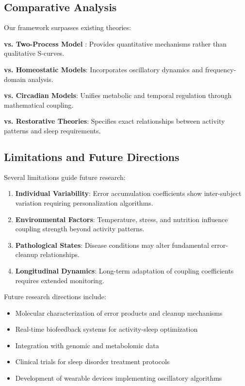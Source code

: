 \documentclass[12pt]{article}
\begin{document}
\subsection{Comparative Analysis}

Our framework surpasses existing theories:

\textbf{vs. Two-Process Model} \citep{borbely1982two}: Provides quantitative mechanisms rather than qualitative S-curves.

\textbf{vs. Homeostatic Models}: Incorporates oscillatory dynamics and frequency-domain analysis.

\textbf{vs. Circadian Models}: Unifies metabolic and temporal regulation through mathematical coupling.

\textbf{vs. Restorative Theories}: Specifies exact relationships between activity patterns and sleep requirements.

\subsection{Limitations and Future Directions}

Several limitations guide future research:

\begin{enumerate}
\item \textbf{Individual Variability}: Error accumulation coefficients show inter-subject variation requiring personalization algorithms.

\item \textbf{Environmental Factors}: Temperature, stress, and nutrition influence coupling strength beyond activity patterns.

\item \textbf{Pathological States}: Disease conditions may alter fundamental error-cleanup relationships.

\item \textbf{Longitudinal Dynamics}: Long-term adaptation of coupling coefficients requires extended monitoring.
\end{enumerate}

Future research directions include:
\begin{itemize}
\item Molecular characterization of error products and cleanup mechanisms
\item Real-time biofeedback systems for activity-sleep optimization  
\item Integration with genomic and metabolomic data
\item Clinical trials for sleep disorder treatment protocols
\item Development of wearable devices implementing oscillatory algorithms
\end{itemize}
\end{document}
